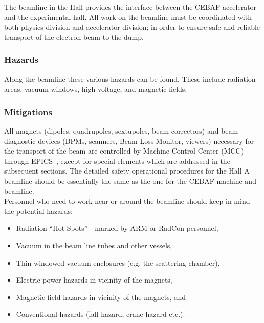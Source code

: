 \begin{safetyen}{0}{0}
%
%

The beamline in the Hall provides the interface between the CEBAF accelerator
and the experimental hall.   All work on the beamline must be coordinated 
with both physics division and accelerator division; in order to ensure
safe and reliable transport of the electron beam to the dump.

\subsubsection{Hazards}

Along the beamline these various hazards can be found.  These include
radiation areas, vacuum windows, high voltage, and magnetic fields.

\subsubsection{Mitigations}

All magnets (dipoles, quadrupoles, sextupoles, beam correctors) and beam 
diagnostic devices (BPMs, scanners, Beam Loss Monitor, viewers) necessary for 
the transport of the beam are controlled by Machine Control Center (MCC) 
through EPICS~\cite{EPICSwww}, except for special elements which are addressed in the 
subsequent sections. The detailed safety operational procedures for the Hall 
A beamline should be essentially the same as the one for the CEBAF machine 
and beamline.\\ 
  
\noindent{}Personnel who need to work near or around the beamline should keep in mind the potential hazards:
\begin{itemize}
  \item Radiation ``Hot Spots'' - marked by ARM or RadCon personnel,
  \item Vacuum in the beam line tubes and other vessels,
  \item Thin windowed vacuum enclosures (e.g. the scattering chamber),
  \item Electric power hazards in vicinity of the magnets,
  \item Magnetic field hazards in vicinity of the magnets, and
  \item Conventional hazards (fall hazard, crane hazard etc.).
\end{itemize}


\end{safetyen}
